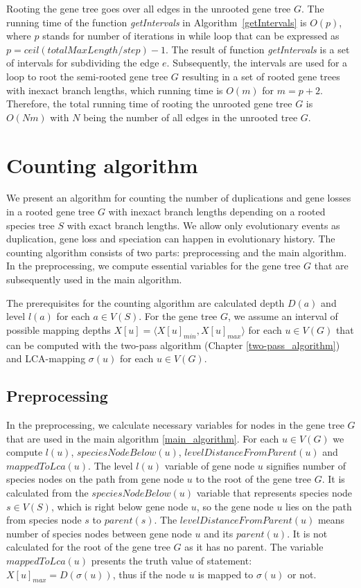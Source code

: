 Rooting the gene tree goes over all edges in the unrooted gene tree $G$. The running time of the function \emph{getIntervals} in Algorithm~\ref{getIntervals} is $O(p)$, where $p$ stands for number of iterations in while loop that can be expressed as $p = ceil(totalMaxLength/step) - 1$. The result of function \emph{getIntervals} is a set of intervals for subdividing the edge $e$. Subsequently, the intervals are used for a loop to root the semi-rooted gene tree $G$ resulting in a set of rooted gene trees with inexact branch lengths, which running time is $O(m)$ for $m = p+2$. Therefore, the total running time of rooting the unrooted gene tree $G$ is $O(Nm)$ with $N$ being the number of all edges in the unrooted tree $G$.


\section{Counting algorithm} \label{counting_algorithm}

We present an algorithm for counting the number of duplications and gene losses in a rooted gene tree $G$ with inexact branch lengths depending on a rooted species tree $S$ with exact branch lengths. We allow only evolutionary events as duplication, gene loss and speciation can happen in evolutionary history. The counting algorithm consists of two parts: preprocessing and the main algorithm. In the preprocessing, we compute essential variables for the gene tree $G$ that are subsequently used in the main algorithm.

The prerequisites for the counting algorithm are calculated depth $D(a)$ and level $l(a)$ for each $a \in V(S)$. For the gene tree $G$, we assume an interval of possible mapping depths $X[u] = \langle X[u]_{min}, X[u]_{max} \rangle$ for each $u \in V(G)$ that can be computed with the two-pass algorithm (Chapter \ref{two-pass_algorithm}) and LCA-mapping $\sigma(u)$ for each $u \in V(G)$.

\subsection{Preprocessing}

In the preprocessing, we calculate necessary variables for nodes in the gene tree $G$ that are used in the main algorithm \ref{main_algorithm}. For each $u \in V(G)$ we compute $l(u)$, $speciesNodeBelow(u)$, $levelDistanceFromParent(u)$ and $mappedToLca(u)$. The level $l(u)$ variable of gene node $u$ signifies number of species nodes on the path from gene node $u$ to the root of the gene tree $G$. It is calculated from the $speciesNodeBelow(u)$ variable that represents species node $s \in V(S)$, which is right below gene node $u$, so the gene node $u$ lies on the path from species node $s$ to $parent(s)$. The $levelDistanceFromParent(u)$ means number of species nodes between gene node $u$ and its $parent(u)$. It is not calculated for the root of the gene tree $G$ as it has no parent. The variable $mappedToLca(u)$ presents the truth value of statement: $X[u]_{max} = D(\sigma(u))$, thus if the node $u$ is mapped to $\sigma(u)$ or not. 

